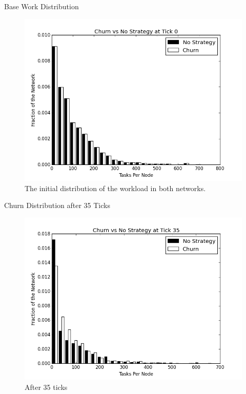 \documentclass[11pt]{beamer}
\begin{document}
\begin{frame}{Base Work Distribution}
\begin{figure}
	\centering
	\includegraphics[width=0.7\linewidth]{figs/ChurnStableHist0}
	\caption[Workload for churn at tick 0]{The initial distribution of the workload in both networks.  }
	
	\label{fig:churnStableHist0}
\end{figure}
\end{frame}




\begin{frame}{Churn Distribution after 35 Ticks}
\begin{figure}
	\centering
	\includegraphics[width=0.7\linewidth]{figs/ChurnStableHist35}
	\caption[Workload for churn at tick 35]{After 35 ticks}
	\label{fig:churnStableHist35}
\end{figure}
\end{frame}
\end{document}
